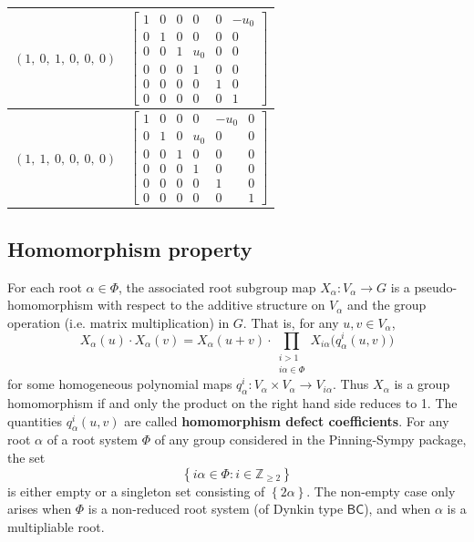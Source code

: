 \documentclass[11pt]{article}
\newcommand{\noi}{\noindent}
\newcommand{\tbf}{\textbf}
\newcommand{\lb}{\left\{}
\newcommand{\rb}{\right\}}
\newcommand{\Z}{\mathbb{Z}}
\theoremstyle{definition}
\begin{document}
\begin{longtable}{|l|c|}
    \hline
    $\left( 1, \  0, \  1, \  0, \  0, \  0\right)$ & ${\left[\begin{matrix}1 & 0 & 0 & 0 & 0 & - u_{0}\\0 & 1 & 0 & 0 & 0 & 0\\0 & 0 & 1 & u_{0} & 0 & 0\\0 & 0 & 0 & 1 & 0 & 0\\0 & 0 & 0 & 0 & 1 & 0\\0 & 0 & 0 & 0 & 0 & 1\end{matrix}\right]}$ \\
    \hline
    $\left( 1, \  1, \  0, \  0, \  0, \  0\right)$ & ${\left[\begin{matrix}1 & 0 & 0 & 0 & - u_{0} & 0\\0 & 1 & 0 & u_{0} & 0 & 0\\0 & 0 & 1 & 0 & 0 & 0\\0 & 0 & 0 & 1 & 0 & 0\\0 & 0 & 0 & 0 & 1 & 0\\0 & 0 & 0 & 0 & 0 & 1\end{matrix}\right]}$ \\
    \hline
\end{longtable}


\subsection{Homomorphism property}

\noi For each root $\alpha \in \Phi$, the associated root subgroup map $X_\alpha:V_\alpha \to G$ is a pseudo-homomorphism with respect to the additive structure on $V_\alpha$ and the group operation (i.e. matrix multiplication) in $G$. That is, for any $u,v \in V_\alpha$,
\begin{equation}
\label{pseudo homomorphism}
	X_\alpha(u) \cdot X_\alpha(v) = X_\alpha(u+v) \cdot \prod_{\substack{i > 1 \\ i \alpha \in \Phi}} X_{i \alpha} \Big( q^i_\alpha(u,v) \Big)
\end{equation}
for some homogeneous polynomial maps $q^i_\alpha:V_\alpha \times V_\alpha \to V_{i \alpha}$. Thus $X_\alpha$ is a group homomorphism if and only the product on the right hand side reduces to 1. The quantities $q^i_\alpha(u,v)$ are called \tbf{homomorphism defect coefficients}. For any root $\alpha$ of a root system $\Phi$ of any group considered in the Pinning-Sympy package, the set
\[
	\lb i \alpha \in \Phi : i \in \Z_{\ge 2} \rb
\]
is either empty or a singleton set consisting of $\lb 2 \alpha \rb$. The non-empty case only arises when $\Phi$ is a non-reduced root system (of Dynkin type $\mathsf{BC}$), and when $\alpha$ is a multipliable root. 
\end{document}
